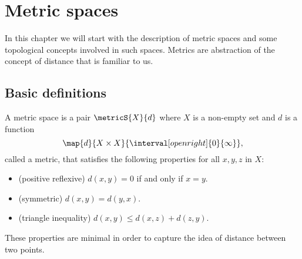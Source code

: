 \chapter{Metric spaces}
In this chapter we will start with the description of metric spaces and some topological concepts involved in
such spaces. Metrics are abstraction of the concept of distance that is familiar to us.
\section{Basic definitions}
\begin{Definition}
    A metric space is a pair $\metricS{X}{d}$ where $X$ is a non-empty set and $d$ is a function
    \[\map{d}{X\times X}{\interval[open right]{0}{\infty}},\]
    called a metric, that satisfies the following properties for all $x,y,z$ in $X$:
    \begin{itemize}
	\item (positive reflexive)
	    $d(x,y) = 0$ if and only if $x = y$.
	\item (symmetric)
	    $d(x,y) = d(y,x)$.
	\item (triangle inequality)
	    $d(x,y) \leq d(x,z) + d(z,y)$.
    \end{itemize}
\end{Definition}
These properties are minimal in order to capture the idea of distance between two points.
